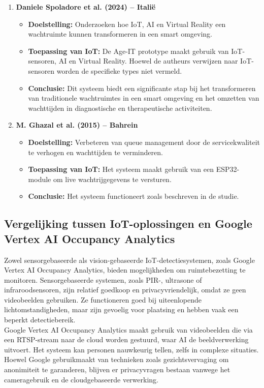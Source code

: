 \begin{enumerate}
    \item \textbf{Daniele Spoladore et al. (2024) – Italië}
    \begin{itemize}
        \item \textbf{Doelstelling:} Onderzoeken hoe IoT, AI en Virtual Reality een wachtruimte kunnen transformeren in een smart omgeving.
        \item \textbf{Toepassing van IoT:} De Age-IT prototype maakt gebruik van IoT-sensoren, AI en Virtual Reality. Hoewel de autheurs verwijzen naar IoT-sensoren worden de specifieke types niet vermeld.
        \item \textbf{Conclusie:} Dit systeem biedt een significante stap bij het transformeren van traditionele wachtruimtes in een smart omgeving en het omzetten van wachttijden in diagnostische en therapeutische activiteiten.
    \end{itemize}
    
    \item \textbf{M. Ghazal et al. (2015) – Bahrein}
    \begin{itemize}
        \item \textbf{Doelstelling:} Verbeteren van queue management door de servicekwaliteit te verhogen en wachttijden te verminderen.
        \item \textbf{Toepassing van IoT:} Het systeem maakt gebruik van een ESP32-module om live wachtrijgegevens te versturen.
        \item \textbf{Conclusie:} Het systeem functioneert zoals beschreven in de studie.
    \end{itemize}
\end{enumerate} 

\subsection{Vergelijking tussen IoT-oplossingen en Google Vertex AI Occupancy Analytics}
Zowel sensorgebaseerde als vision-gebaseerde IoT-detectiesystemen, zoals Google Vertex AI Occupancy Analytics, bieden mogelijkheden om ruimtebezetting te monitoren. Sensorgebaseerde systemen, zoals PIR-, ultrasone of infraroodsensoren, zijn relatief goedkoop en privacyvriendelijk, omdat ze geen videobeelden gebruiken. Ze functioneren goed bij uiteenlopende lichtomstandigheden, maar zijn gevoelig voor plaatsing en hebben vaak een beperkt detectiebereik. \\

Google Vertex AI Occupancy Analytics maakt gebruik van videobeelden die via een RTSP-stream naar de cloud worden gestuurd, waar AI de beeldverwerking uitvoert. Het systeem kan personen nauwkeurig tellen, zelfs in complexe situaties. Hoewel Google gebruikmaakt van technieken zoals gezichtsvervaging om anonimiteit te garanderen, blijven er privacyvragen bestaan vanwege het cameragebruik en de cloudgebaseerde verwerking. \\

